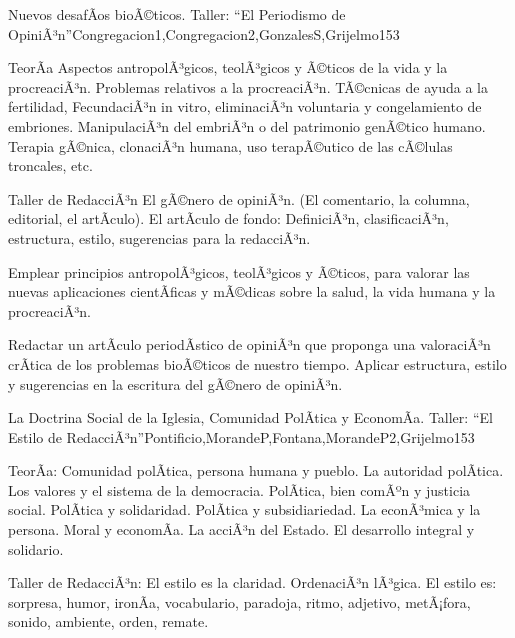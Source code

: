 \begin{syllabus}
\begin{unit}{Nuevos desafÃ­os bioÃ©ticos. Taller: ``El Periodismo de OpiniÃ³n''}{Congregacion1,Congregacion2,GonzalesS,Grijelmo}{15}{3}
\begin{topics}
	\item TeorÃ­a
 		\subitem Aspectos antropolÃ³gicos, teolÃ³gicos y Ã©ticos de la vida y la procreaciÃ³n. 
 		\subitem Problemas relativos a la procreaciÃ³n. TÃ©cnicas de ayuda a la fertilidad, FecundaciÃ³n in vitro, eliminaciÃ³n voluntaria y congelamiento de embriones.
 		\subitem ManipulaciÃ³n del embriÃ³n o del patrimonio genÃ©tico humano. Terapia gÃ©nica, clonaciÃ³n humana, uso terapÃ©utico de las cÃ©lulas troncales, etc.
	\item Taller de RedacciÃ³n
 		\subitem El gÃ©nero de opiniÃ³n. (El comentario, la columna, editorial, el artÃ­culo).
 		\subitem El artÃ­culo de fondo: DefiniciÃ³n, clasificaciÃ³n, estructura, estilo, sugerencias para la redacciÃ³n.
\end{topics}
\begin{unitgoals}
	\item Emplear principios antropolÃ³gicos, teolÃ³gicos y Ã©ticos, para valorar las nuevas aplicaciones cientÃ­ficas y mÃ©dicas sobre la salud, la vida humana y la procreaciÃ³n.
	\item Redactar un artÃ­culo periodÃ­stico de opiniÃ³n que proponga una valoraciÃ³n crÃ­tica de los problemas bioÃ©ticos de nuestro tiempo. Aplicar estructura, estilo y sugerencias en la escritura del gÃ©nero de opiniÃ³n.
\end{unitgoals}
\end{unit}

\begin{unit}{La Doctrina Social de la Iglesia, Comunidad PolÃ­tica y EconomÃ­a. Taller: ``El Estilo de RedacciÃ³n''}{Pontificio,MorandeP,Fontana,MorandeP2,Grijelmo}{15}{3}
\begin{topics}
	\item TeorÃ­a:
 		\subitem Comunidad polÃ­tica, persona humana y pueblo. La autoridad polÃ­tica. Los valores y el sistema de la democracia. PolÃ­tica, bien comÃºn y justicia social. PolÃ­tica y solidaridad. PolÃ­tica y subsidiariedad.
 		\subitem La econÃ³mica y la persona. Moral y economÃ­a. La acciÃ³n del Estado. El desarrollo integral y solidario.
	\item Taller de RedacciÃ³n:
 		\subitem El estilo es la claridad. OrdenaciÃ³n lÃ³gica. El estilo es: sorpresa, humor, ironÃ­a, vocabulario, paradoja, ritmo, adjetivo, metÃ¡fora, sonido, ambiente, orden, remate.


\end{topics}
\end{unit}
\end{syllabus}
